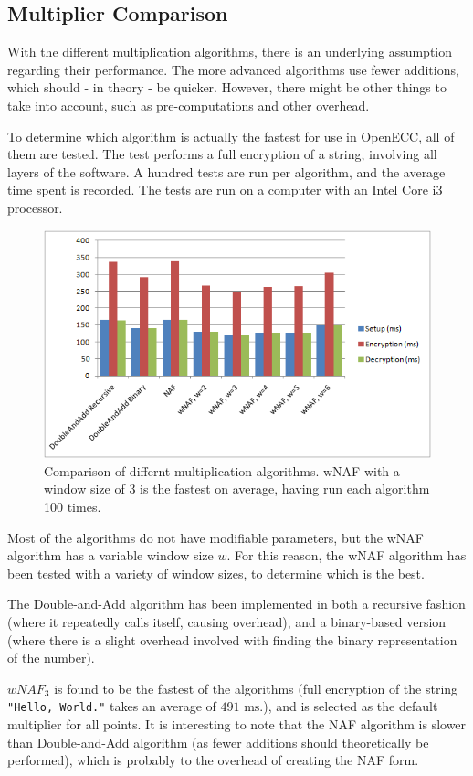 \subsection{Multiplier Comparison}

With the different multiplication algorithms, there is an underlying assumption regarding their performance. The more
advanced algorithms use fewer additions, which should - in theory - be quicker. However, there might be other things
to take into account, such as pre-computations and other overhead.

To determine which algorithm is actually the fastest for use in OpenECC, all of them are tested. The test performs a
full  encryption of a string, involving all layers of the software. A hundred tests are run
per algorithm, and the average time spent is recorded. The tests are run on a computer with an Intel Core i3 processor.

\begin{figure}[htb!]
	\centering
	\includegraphics[width=\textwidth]{performance/multipliers-comparison}
	\caption{Comparison of differnt multiplication algorithms. wNAF with a window size of 3 is the fastest on average,
		having run each algorithm 100 times.}
	\label{fig:multipliers-comparison}
\end{figure}

Most of the algorithms do not have modifiable parameters, but the wNAF algorithm has a variable window size \(w\). For
this reason, the wNAF algorithm has been tested with a variety of window sizes, to determine which is the best.

The Double-and-Add algorithm has been implemented in both a recursive fashion (where it repeatedly calls itself, causing
overhead), and a binary-based version (where there is a slight overhead involved with finding the binary representation
of the number).

\(wNAF_3\) is found to be the fastest of the algorithms (full encryption of the string \texttt{"Hello, World."} takes an
average of \(491 \text{ ms}\).), and is selected as the default multiplier for all points. It is
interesting to note that the NAF algorithm is slower than Double-and-Add algorithm (as fewer additions should theoretically
be performed), which is probably to the overhead of creating the NAF form.